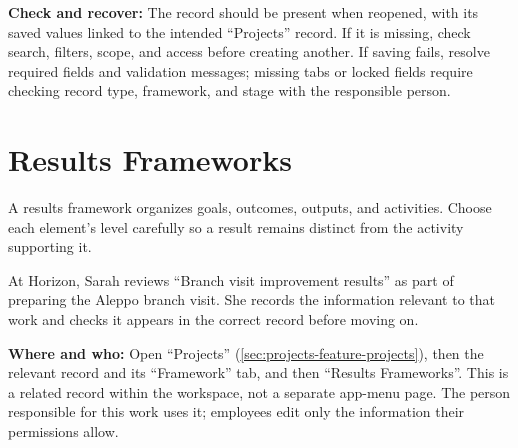 \textbf{Check and recover:} The record should be present when reopened, with its saved values linked to the intended “Projects” record. If it is missing, check search, filters, scope, and access before creating another. If saving fails, resolve required fields and validation messages; missing tabs or locked fields require checking record type, framework, and stage with the responsible person.

\clearpage
\section{Results Frameworks}
\label{sec:projects-feature-logframes}

A results framework organizes goals, outcomes, outputs, and activities. Choose each element's level carefully so a result remains distinct from the activity supporting it.

\begin{rcnote}
At Horizon, Sarah reviews “Branch visit improvement results” as part of preparing the Aleppo branch visit. She records the information relevant to that work and checks it appears in the correct record before moving on.
\end{rcnote}

\textbf{Where and who:} Open “Projects” (\ref{sec:projects-feature-projects}), then the relevant record and its “Framework” tab, and then “Results Frameworks”. This is a related record within the workspace, not a separate app-menu page. The person responsible for this work uses it; employees edit only the information their permissions allow.

